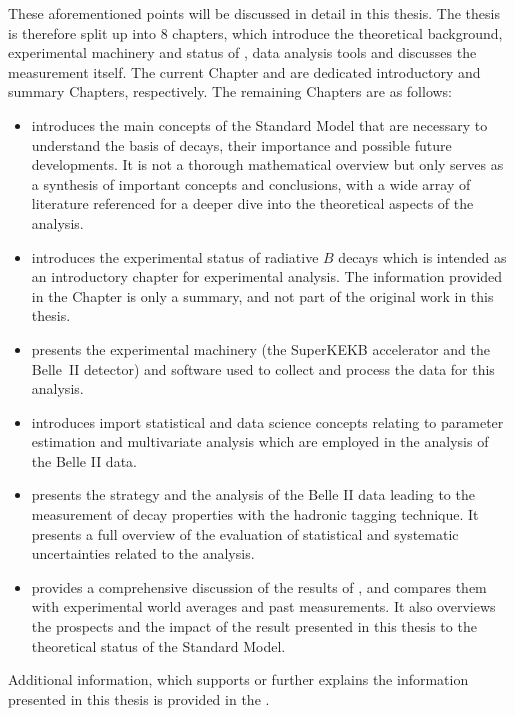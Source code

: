 These aforementioned points will be discussed in detail in this thesis.
The thesis is therefore split up into 8 chapters, which introduce the theoretical background, experimental machinery and status of \BtoXsgamma, data analysis tools and discusses the measurement itself.
The current Chapter and  are dedicated introductory and summary Chapters, respectively.
The remaining Chapters are as follows:
\begin{itemize}
    \item {} introduces the main concepts of the Standard Model that are necessary to understand the basis of \BtoXsgamma decays, their importance and possible future developments.
    It is not a thorough mathematical overview but only serves as a synthesis of important concepts and conclusions, with a wide array of literature referenced for a deeper dive into the theoretical aspects of the analysis.
    \item {} introduces the experimental status of radiative $B$ decays which is intended as an introductory chapter for experimental \BtoXsgamma analysis.
    The information provided in the Chapter is only a summary, and not part of the original work in this thesis.
    \item {} presents the experimental machinery (the SuperKEKB accelerator and the Belle~II detector) and software used to collect and process the data for this analysis.
    \item {} introduces import statistical and data science concepts relating to parameter estimation and multivariate analysis which are employed in the analysis of the Belle II data.
    \item {} presents the strategy and the analysis of the Belle II data leading to the measurement of \BtoXsgamma decay properties with the hadronic tagging technique.
    It presents a full overview of the evaluation of statistical and systematic uncertainties related to the analysis.
    \item {} provides a comprehensive discussion of the results of , and compares them with experimental world averages and past measurements.
    It also overviews the prospects and the impact of the result presented in this thesis to the theoretical status of the Standard Model.
\end{itemize}
Additional information, which supports or further explains the information presented in this thesis is provided in the .

